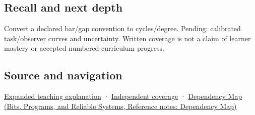 \subsection{Recall and next depth}\label{appendix-b491fc48c54b-recall-and-next-depth}

Convert a declared bar/gap convention to cycles/degree. Pending: calibrated task/observer curves and uncertainty. Written coverage is not a claim of learner mastery or accepted numbered-curriculum progress.

\subsection{Source and navigation}\label{appendix-b491fc48c54b-source-and-navigation}

\hyperref[04-visual-computing-ii-ch042-visibility-is-about-contrast-conditions-and-tasks]{Expanded teaching explanation} · \hyperref[appendix-fd090d982a15-xr01---independent-seeing-and-representation-source]{Independent coverage} · \href{../01-Bits-Programs-and-Reliable-Systems/main.pdf\#nameddest=appendix-4ad47bdd269a}{Dependency Map (Bits, Programs, and Reliable Systems, Reference notes: Dependency Map)}
